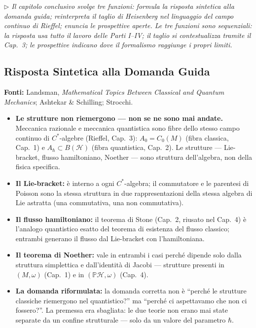 \documentclass[12pt, a4paper]{article}
\newcommand{\fonti}[1]{%
	\begin{fontebox}
		\textcolor{fontecolor}{\footnotesize\textbf{Fonti:} #1}
	\end{fontebox}%
}
\newcommand{\nota}[1]{%
	\par\smallskip
	\noindent\textit{\small $\triangleright$\; #1}
	\par\smallskip
}
\begin{document}
	\nota{Il capitolo conclusivo svolge tre funzioni: formula la risposta sintetica alla
		domanda guida; reinterpreta il taglio di Heisenberg nel linguaggio del campo continuo
		di Rieffel; enuncia le prospettive aperte. Le tre funzioni sono sequenziali: la
		risposta usa tutto il lavoro delle Parti I--IV; il taglio si contestualizza tramite
		il Cap.\ 3; le prospettive indicano dove il formalismo raggiunge i propri limiti.}
	
	\subsection*{Risposta Sintetica alla Domanda Guida}
	
	\fonti{Landsman, \textit{Mathematical Topics Between Classical and Quantum Mechanics};
		Ashtekar \& Schilling; Strocchi.}
	
	\begin{itemize}
		\item \textbf{Le strutture non riemergono --- non se ne sono mai andate.}
		Meccanica razionale e meccanica quantistica sono fibre dello stesso campo continuo
		di $C^*$-algebre (Rieffel, Cap.\ 3): $A_0 = C_0(M)$ (fibra classica, Cap.\ 1)
		e $A_\hbar \subset B(\mathcal{H})$ (fibra quantistica, Cap.\ 2). Le strutture
		--- Lie-bracket, flusso hamiltoniano, Noether --- sono struttura dell'algebra,
		non della fisica specifica.
		\item \textbf{Il Lie-bracket:} è interno a ogni $C^*$-algebra; il commutatore
		e le parentesi di Poisson sono la stessa struttura in due rappresentazioni della
		stessa algebra di Lie astratta (una commutativa, una non commutativa).
		\item \textbf{Il flusso hamiltoniano:} il teorema di Stone (Cap.\ 2, riusato nel
		Cap.\ 4) è l'analogo quantistico esatto del teorema di esistenza del flusso classico;
		entrambi generano il flusso dal Lie-bracket con l'hamiltoniana.
		\item \textbf{Il teorema di Noether:} vale in entrambi i casi perché dipende solo
		dalla struttura simplettica e dall'identità di Jacobi --- strutture presenti in
		$(M, \omega)$ (Cap.\ 1) e in $(\mathbb{P}\mathcal{H}, \omega)$ (Cap.\ 4).
		\item \textbf{La domanda riformulata:} la domanda corretta non è ``perché le strutture
		classiche riemergono nel quantistico?'' ma ``perché ci aspettavamo che non ci
		fossero?''. La premessa era sbagliata: le due teorie non erano mai state separate
		da un confine strutturale --- solo da un valore del parametro $\hbar$.
	\end{itemize}
	
\end{document}
